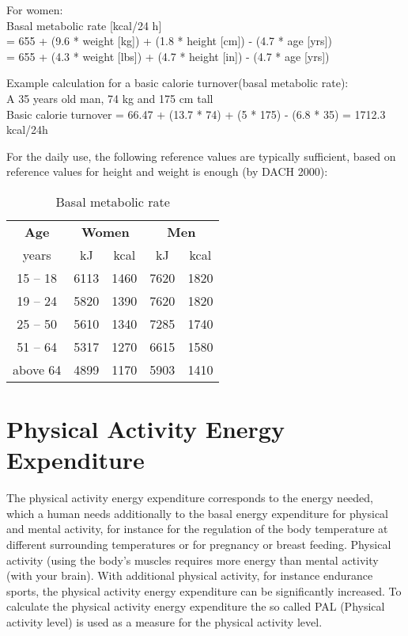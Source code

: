 \documentclass[../main.tex]{subfiles}
\begin{document}
\vspace{3mm}

\noindent For women:\\
Basal metabolic rate  [kcal/24 h] \\
= 655 + (9.6 * weight [kg]) + (1.8 * height [cm]) - (4.7 * age [yrs]) \\
= 655 + (4.3 * weight [lbs]) + (4.7 * height [in]) - (4.7 * age [yrs])

\vspace{3mm}

\noindent Example calculation for a basic calorie turnover(basal metabolic rate):\\
A 35 years old man, 74 kg and 175 cm tall\\
Basic calorie turnover = 66.47 + (13.7 * 74) + (5 * 175) - (6.8 * 35) = 1712.3 kcal/24h

\vspace{3mm}

For the daily use, the following reference values are typically sufficient,
based on reference values for height and weight is enough (by DACH 2000):

\begin{table}[htb]
  \centering
  \begin{tabular}{c c c c c}
    \textbf{Age} & \multicolumn{2}{c}{\textbf{Women}} & \multicolumn{2}{c}{\textbf{Men}} \\
    years & kJ & kcal & kJ & kcal \\
    \hline
    15 -- 18 & 6113 & 1460 & 7620 & 1820 \\
    19 -- 24 & 5820 & 1390 & 7620 & 1820 \\
    25 -- 50 & 5610 & 1340 & 7285 & 1740 \\
    51 -- 64 & 5317 & 1270 & 6615 & 1580 \\
    above 64 & 4899 & 1170 & 5903 & 1410 \\
  \end{tabular}
  \caption{Basal metabolic rate}
\end{table}

\section{Physical Activity Energy Expenditure}

The physical activity energy expenditure corresponds to the energy needed, which a human needs additionally to the basal energy expenditure for physical and mental activity, for instance for the regulation of the body temperature at different surrounding temperatures or for pregnancy or breast feeding.
Physical activity (using the body's muscles requires more energy than mental activity (with your brain). With additional physical activity, for instance endurance sports, the physical activity energy expenditure can be significantly increased.
To calculate the physical activity energy expenditure the so called PAL (Physical activity level) is used as a measure for the physical activity level.
\end{document}
